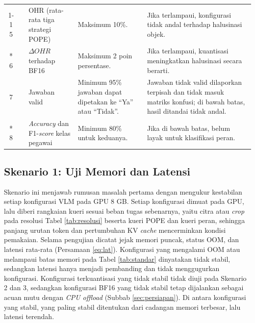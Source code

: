 {\begin{longtable}{|c|>{\raggedright\arraybackslash}p{1.9cm}|>{\raggedright\arraybackslash}p{3.0cm}|>{\raggedright\arraybackslash}p{3.9cm}|>{\raggedright\arraybackslash}p{4.2cm}|}
    \cline{1-1}\cline{3-5}
    5 & & OHR (rata-rata tiga strategi POPE) & Maksimum 10\%. & Jika terlampaui, konfigurasi tidak andal terhadap halusinasi objek. \\*
    \cline{1-1}\cline{3-5}
    6 & & $\Delta OHR$ terhadap BF16 & Maksimum 2 poin persentase. & Jika terlampaui, kuantisasi meningkatkan halusinasi secara berarti. \\
    \hline
    7 & \multirow{2}{*}{Skenario 3} & Jawaban valid & Minimum 95\% jawaban dapat dipetakan ke ``Ya'' atau ``Tidak''. & Jawaban tidak valid dilaporkan terpisah dan tidak masuk matriks konfusi; di bawah batas, hasil ditandai tidak andal. \\*
    \cline{1-1}\cline{3-5}
    8 & & \textit{Accuracy} dan F1-\textit{score} kelas pegawai & Minimum 80\% untuk keduanya. & Jika di bawah batas, belum layak untuk klasifikasi peran. \\
    \hline
\end{longtable}
}

\subsection{Skenario 1: Uji Memori dan Latensi}
Skenario ini menjawab rumusan masalah pertama dengan mengukur kestabilan setiap konfigurasi VLM pada GPU 8 GB. Setiap konfigurasi dimuat pada GPU, lalu diberi rangkaian kueri sesuai beban tugas sebenarnya, yaitu citra atau \textit{crop} pada resolusi Tabel \ref{tab:resolusi} beserta kueri POPE dan kueri peran, sehingga panjang urutan token dan pertumbuhan KV \textit{cache} mencerminkan kondisi pemakaian. Selama pengujian dicatat jejak memori puncak, status OOM, dan latensi rata-rata (Persamaan \ref{eq:lat}). Konfigurasi yang mengalami OOM atau melampaui batas memori pada Tabel \ref{tab:standar} dinyatakan tidak stabil, sedangkan latensi hanya menjadi pembanding dan tidak menggugurkan konfigurasi. Konfigurasi terkuantisasi yang tidak stabil tidak diuji pada Skenario 2 dan 3, sedangkan konfigurasi BF16 yang tidak stabil tetap dijalankan sebagai acuan mutu dengan \textit{CPU offload} (Subbab \ref{sec:persiapan}). Di antara konfigurasi yang stabil, yang paling stabil ditentukan dari cadangan memori terbesar, lalu latensi terendah.

